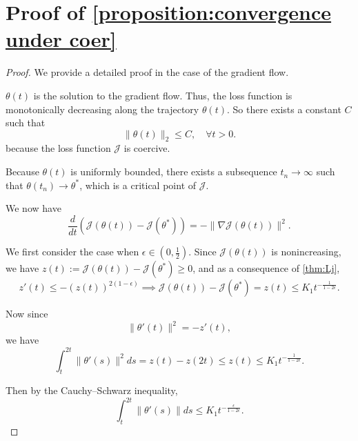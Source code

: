 \documentclass{article}
\begin{document}
\section{Proof of \texorpdfstring{\cref{proposition:convergence under coer}}{Proposition \ref{proposition:convergence under coer}}}\label{sec:proof convergence under coer}
\begin{proof}
    We provide a detailed proof in the case of the gradient flow.

    \( \theta(t) \) is the solution to the gradient flow. 
    Thus, the loss function is monotonically decreasing along the trajectory $\theta(t)$. So there exists a constant \( C \) such that 
    \begin{equation*}
        \|\theta(t)\|_{2} \leq C, \quad \forall t>0 .
    \end{equation*} 
    because the loss function  $\mathcal{J}$ is coercive.

    Because $\theta(t)$ is uniformly bounded, there exists a subsequence \( t_n \to \infty \) such that \( \theta(t_n) \to \theta^* \), which is a critical point of $\mathcal{J}$.
    
    We now have  
    \begin{equation*}
        \frac{d}{dt} \left(\mathcal{J}(\theta(t))-\mathcal{J}(\theta^*)\right) = -\|\nabla \mathcal{J}(\theta(t))\|^2  .
    \end{equation*}
     
    We first consider the case when $\epsilon \in(0,\frac{1}{2})$. Since \(\mathcal{J}(\theta(t))\) is nonincreasing, we have \(z(t) := \mathcal{J}(\theta(t))-\mathcal{J}(\theta^*) \ge 0\), and as a consequence of \cref{thm:Lj},  
    \begin{equation}
    z'(t) \le - (z(t))^{2(1-\epsilon)} \implies \mathcal{J}(\theta(t))-\mathcal{J}(\theta^*) =z(t) \le K_1 t^{-\frac{1}{1-2\epsilon}} . \label{eq:ode}
    \end{equation} 
    
    Now since  
    \begin{equation*}  
    \|\theta'(t)\|^2 = -z'(t)  ,
    \end{equation*}  
    we have  
    \begin{equation*}  
    \int_t^{2t} \|\theta'(s)\|^2 ds = z(t) - z(2t) \le z(t) \le K_1 t^{-\frac{1}{1-2\epsilon}}  .
    \end{equation*}  
    
    Then by the Cauchy--Schwarz inequality,  
    \begin{equation*}  
    \int_t^{2t} \|\theta'(s)\| ds \le K_1 t^{-\frac{\epsilon}{1-2\epsilon}}  .
    \end{equation*}  
    

\end{proof}
\end{document}
